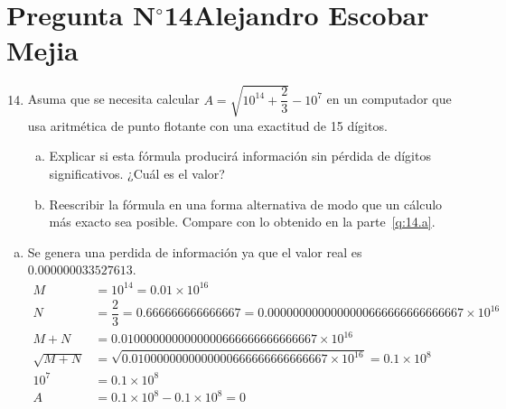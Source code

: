 \section{Pregunta N$^{\circ}$14\qquad Alejandro Escobar Mejia}

\begin{frame}
	\begin{enumerate}\setcounter{enumi}{13}
		\item

		      Asuma que se necesita calcular
		      \begin{math}
			      A=
			      \sqrt{10^{14}+\dfrac{2}{3}}-10^{7}
		      \end{math}
		      en un computador que usa aritmética de punto flotante con
		      una exactitud de 15 dígitos.

		      \begin{enumerate}[a)]
			      \item\label{q:14.a}

			      Explicar si esta fórmula producirá información sin
			      pérdida de dígitos significativos.
			      ¿Cuál es el valor?

			      \item\label{q:14.b}

			      Reescribir la fórmula en una forma alternativa de
			      modo que un cálculo más exacto sea posible.
			      Compare con lo obtenido en la parte~\eqref{q:14.a}.
		      \end{enumerate}
	\end{enumerate}

	\begin{solution}
		\begin{enumerate}[a)]
			\item

			      Se genera una perdida de información ya que el valor real es $0.000000033527613$.
			      \begin{align*}
				      M          & = 10^{14}=0.01\times 10^{16}                                                     \\
				      N          & = \dfrac{2}{3}=0.666666666666667=0.0000000000000000666666666666667\times 10^{16} \\
				      M+N        & =0.0100000000000000666666666666667\times 10^{16}                                 \\
				      \sqrt{M+N} & =\sqrt{0.0100000000000000666666666666667\times 10^{16}}=0.1\times 10^{8}         \\
				      10^{7}     & =0.1\times 10^{8}                                                                \\
				      A          & =0.1\times 10^{8}-0.1\times 10^{8}=0
			      \end{align*}


\end{enumerate}
\end{solution}
\end{frame}
